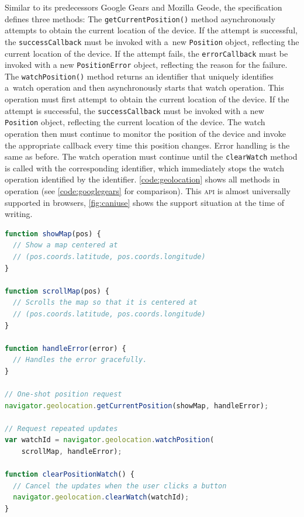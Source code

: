 \documentclass[sigconf,hyphens]{acmart}
\begin{document}
Similar to its predecessors Google Gears and Mozilla Geode,
the specification defines three methods:
The \texttt{getCurrentPosition()} method asynchronously attempts
to obtain the current location of the device.
If the attempt is successful, the \texttt{successCallback} must be invoked
with a~new \texttt{Position} object, reflecting the current location of the device.
If the attempt fails, the \texttt{errorCallback} must be invoked
with a new \texttt{PositionError} object,
reflecting the reason for the failure.
The \texttt{watchPosition()} method returns an identifier that uniquely
identifies a~watch operation and then asynchronously starts that watch operation.
This operation must first attempt to obtain the current location of the device.
If the attempt is successful, the \texttt{successCallback} must be invoked
with a new \texttt{Position} object, reflecting the current location of the device.
The watch operation then must continue to monitor the position of the device
and invoke the appropriate callback every time this position changes.
Error handling is the same as before.
The watch operation must continue until the \texttt{clearWatch} method
is called with the corresponding identifier,
which immediately stops the watch operation identified by the identifier.
\autoref{code:geolocation} shows all methods in operation
(see \autoref{code:googlegears} for comparison). 
This \textsc{api} is almost universally supported in browsers,
\autoref{fig:caniuse} shows the support situation at the time of writing.

\begin{lstlisting}[caption={Geolocation \textsc{api}},
  label=code:geolocation, language=JavaScript, float=h] 
function showMap(pos) {
  // Show a map centered at
  // (pos.coords.latitude, pos.coords.longitude)
}

function scrollMap(pos) {
  // Scrolls the map so that it is centered at
  // (pos.coords.latitude, pos.coords.longitude)
}

function handleError(error) {
  // Handles the error gracefully.
}

// One-shot position request
navigator.geolocation.getCurrentPosition(showMap, handleError);

// Request repeated updates
var watchId = navigator.geolocation.watchPosition(
    scrollMap, handleError);

function clearPositionWatch() {
  // Cancel the updates when the user clicks a button
  navigator.geolocation.clearWatch(watchId);
}	
\end{lstlisting}
\end{document}
